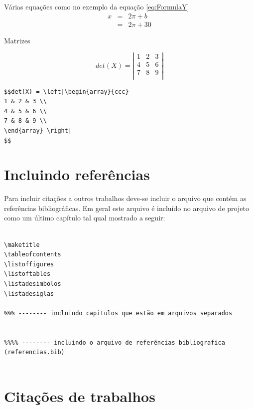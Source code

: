 Várias equações como no exemplo da equação \ref{eq:FormulaY}
\begin{eqnarray}
x & = & 2\pi + b \nonumber\\
	&	= & 2\pi + 30  	
\label{eq:FormulaY}
\end{eqnarray}

Matrizes 

$$det(X) = \left|\begin{array}{ccc} 
1 & 2 & 3 \\
4 & 5 & 6 \\
7 & 8 & 9 \\
\end{array} \right| 
$$

\begin{verbatim}
$$det(X) = \left|\begin{array}{ccc} 
1 & 2 & 3 \\
4 & 5 & 6 \\
7 & 8 & 9 \\
\end{array} \right| 
$$
\end{verbatim}






\section{Incluindo referências}

Para incluir citações a outros trabalhos deve-se incluir o arquivo que contém as referências bibliográficas. Em geral este arquivo é incluído no arquivo de projeto como um último capítulo tal qual mostrado a seguir:

\begin{verbatim}

\maketitle
\tableofcontents
\listoffigures
\listoftables
\listadesimbolos
\listadesiglas

%%% -------- incluindo capitulos que estão em arquivos separados


%%%% -------- incluindo o arquivo de referências bibliografica (referencias.bib)


\end{verbatim}

\section{Citações de trabalhos}

